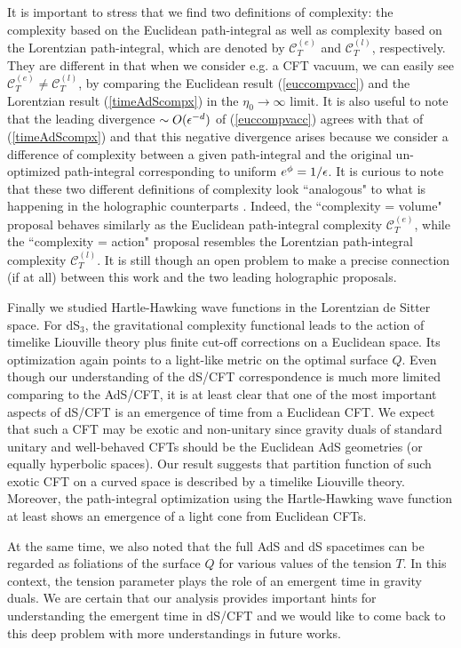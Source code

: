 \documentclass[a4paper,12pt]{article}
\begin{document}
It is important to stress that we find two definitions of complexity: the complexity based on the Euclidean path-integral
as well as complexity based on the Lorentzian path-integral, which are denoted by  $\mathcal{C}^{(e)}_T$ and  $\mathcal{C}^{(l)}_T$, respectively.
They are different in that when we consider e.g. a CFT vacuum, we can easily see  $\mathcal{C}^{(e)}_T\neq \mathcal{C}^{(l)}_T$, by comparing the Euclidean result (\ref{euccompvacc}) and the Lorentzian result (\ref{timeAdScompx}) in the $\eta_0\to \infty$ limit. It is also useful to note that the leading divergence $\sim O(\epsilon^{-d})$ 
of (\ref{euccompvacc}) agrees with that of  (\ref{timeAdScompx}) and that this negative divergence arises because 
we consider a difference of complexity between a given path-integral and the original un-optimized path-integral 
corresponding to uniform $e^\phi=1/\epsilon$. It is curious to note that these two different definitions of complexity look ``analogous" to what is happening in the holographic counterparts \cite{Susskind}. Indeed, the ``complexity = volume" proposal behaves similarly as the Euclidean path-integral complexity $\mathcal{C}^{(e)}_T$, while the ``complexity = action" proposal resembles the Lorentzian path-integral complexity $\mathcal{C}^{(l)}_T$. It is still though an open problem to make a precise connection (if at all) between this work and the two leading holographic proposals.

Finally we studied Hartle-Hawking wave functions in the Lorentzian de Sitter space. For dS$_3$, the gravitational  complexity functional leads to the action of timelike Liouville theory plus finite cut-off corrections on a Euclidean space. Its optimization again points to a light-like metric on the optimal surface $Q$. Even though our understanding of the dS/CFT correspondence  is much more limited comparing to the AdS/CFT, it is at least clear that one of the most important aspects of dS/CFT is an emergence of time from a Euclidean CFT. We expect that such a CFT may be exotic and non-unitary since gravity duals of standard unitary and well-behaved CFTs should be the Euclidean AdS geometries (or equally hyperbolic spaces). Our result suggests that partition function of such exotic CFT on a curved space is described by a timelike Liouville theory. Moreover, the path-integral optimization using the  Hartle-Hawking wave function at least shows an emergence of a light cone from Euclidean CFTs. 

At the same time, we also noted that the full AdS and dS spacetimes can be regarded as foliations of the surface $Q$ for various values of the tension $T$. In this context, the tension parameter plays the role of an emergent time in gravity duals. We are certain that our analysis provides important hints for understanding the emergent time in dS/CFT and we would like to come back to this deep problem with more understandings in future works.
\end{document}

